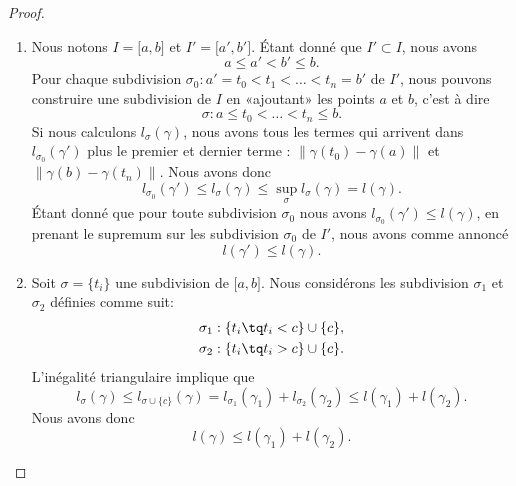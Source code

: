 \begin{proof}
    \begin{enumerate}
        \item
            Nous notons $I=\mathopen[ a , b \mathclose]$ et $I'=\mathopen[ a' , b' \mathclose]$. Étant donné que $I'\subset I$, nous avons
            \begin{equation}
                a\leq a'<b'\leq b.
            \end{equation}
            Pour chaque subdivision $\sigma_0:a'=t_0<t_1<\ldots<t_n=b'$ de $I'$, nous pouvons construire une subdivision de $I$ en «ajoutant» les points $a$ et $b$, c'est à dire
            \begin{equation}
                \sigma:a\leq t_0<\ldots<t_n\leq b.
            \end{equation}
            Si nous calculons $l_{\sigma}(\gamma)$, nous avons tous les termes qui arrivent dans $l_{\sigma_0}(\gamma')$ plus le premier et dernier terme : $\| \gamma(t_0)-\gamma(a) \|$ et $\| \gamma(b)-\gamma(t_n)\|$. Nous avons donc
            \begin{equation}
                l_{\sigma_0}(\gamma')\leq l_{\sigma}(\gamma)\leq\sup_{\sigma}l_{\sigma}(\gamma)=l(\gamma).
            \end{equation}
            Étant donné que pour toute subdivision $\sigma_0$ nous avons $l_{\sigma_0}(\gamma')\leq l(\gamma)$, en prenant le supremum sur les subdivision $\sigma_0$ de $I'$, nous avons comme annoncé
            \begin{equation}
                l(\gamma')\leq l(\gamma).
            \end{equation}
        \item
            Soit $\sigma=\{ t_i \}$ une subdivision de $\mathopen[ a , b \mathclose]$. Nous considérons les subdivision $\sigma_1$ et $\sigma_2$ définies comme suit:
            \begin{equation}
                \begin{aligned}[]
                    \sigma_1&:\{ t_i\tq t_i< c \}\cup\{ c \},\\
                    \sigma_2&:\{ t_i\tq t_i> c \}\cup\{ c \}.
                \end{aligned}
            \end{equation}
            L'inégalité triangulaire implique que
            \begin{equation}
                l_{\sigma}(\gamma)\leq l_{\sigma\cup\{ c \}}(\gamma)=l_{\sigma_1}(\gamma_1)+l_{\sigma_2}(\gamma_2)\leq l(\gamma_1)+l(\gamma_2).
            \end{equation}
            Nous avons donc 
            \begin{equation}    \label{EqIneglglglgud}
                l(\gamma)\leq l(\gamma_1)+l(\gamma_2).
            \end{equation}


\end{enumerate}
\end{proof}
